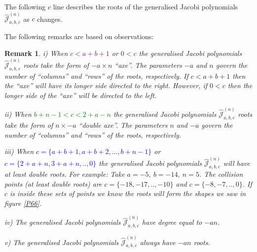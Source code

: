 \documentclass[12pt]{article}
\def\J{\mathcal{J}}
\newtheorem{mydef3}{Remark}[section]
\numberwithin{figure}{section}
\numberwithin{equation}{section}
\numberwithin{table}{section}
\begin{document}
\vspace{1cm}
The following $c$ line describes the roots of the generalised Jacobi polynomials $\widehat{\J}_{a,b,c}^{(n)}$ as $c$ changes.


The following remarks are based on observations:
\begin{mydef3}
\item[i)]
When \textcolor{purple}{$c<a+b+1$} or \textcolor{purple}{$0<c$} the generalised Jacobi polynomials $\widehat{\J}_{a,b,c}^{(n)}$ roots take the form of $-a\times n$ ``axe''. The parameters $-a$ and $n$ govern the number of ``columns'' and ``rows'' of the roots, respectively. If $c<a+b+1$ then the ``axe'' will have its longer side directed to the right. However, if $0<c$ then the longer side of the ``axe'' will be directed to the left.
\item[ii)]
When \textcolor{green}{$b+n-1<c<2+a-n$} the generalised Jacobi polynomials $\widehat{\J}_{a,b,c}^{(n)}$ roots take the form of $n\times -a$ ``double axe''. The parameters $n$ and $-a$ govern the number of ``columns'' and ``rows'' of the roots, respectively.
\item[iii)]
When \textcolor{blue}{$c=\{a+b+1,a+b+2,...,b+n-1\}$} or \textcolor{blue}{$c=\{2+a+n,3+a+n,..,0\}$} the generalised Jacobi polynomials $\widehat{\J}_{a,b,c}^{(n)}$ will have at least double roots.
For example: Take $a=-5,~b=-14,~n=5$. The collision points (at least double roots) are $c=\{-18,-17,..,-10\}$ and $c=\{-8,-7,..,0\}$. If $c$ is inside these sets of points we know the roots will form the shapes we saw in figure \ref{P66}.
\item[iv)]
The generalised Jacobi polynomials $\widehat{\J}_{a,b,c}^{(n)}$ have degree equal to $-an$.
\item[v)]
The generalised Jacobi polynomials $\widehat{\J}_{a,b,c}^{(n)}$ always have $-an$ roots.
\end{mydef3}
\normalsize
\end{document}
